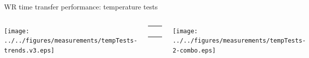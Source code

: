 \documentclass[compress,red]{beamer}
\newcommand{\backupend}{
   \addtocounter{framenumberappendix}{-\value{framenumber}}
   \addtocounter{framenumber}{\value{framenumberappendix}} 
}
\begin{document}
\begin{frame}{WR time transfer performance: temperature tests}

  \begin{columns}[c]
		\hspace{-1.0cm}
		\begin{center}
		\texttt{[image: ../../figures/measurements/tempTests-trends.v3.eps]}
		\end{center}

		\begin{center}
		  \begin{table}[!t] \footnotesize 
		  \begin{tabular}{ c  c }     
		  \multicolumn{2}{c}{ }       \\         
		   \multicolumn{2}{c}{ }       \\    
		     &    \\ 
		    &     \\ 
		  \end{tabular}
		  \end{table}   		
		\end{center}

		\hspace{-0.8cm}
		\begin{center}
		\texttt{[image: ../../figures/measurements/tempTests-2-combo.eps]}
		\end{center}


  \end{columns} 
\end{frame}



\backupend

\end{document}
